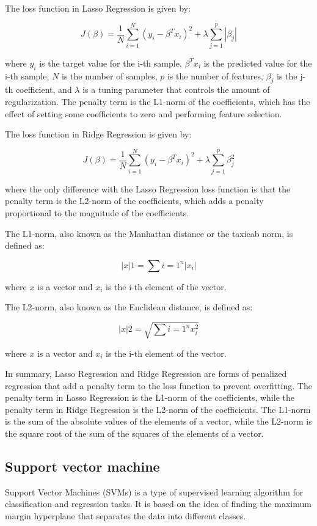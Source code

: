 \documentclass[12pt, a4paper, oneside]{article}
\begin{document}
The loss function in Lasso Regression is given by:

$$ J(\beta) = \frac{1}{N} \sum_{i=1}^{N} (y_i - \beta^T x_i)^2 + \lambda \sum_{j=1}^{p} |\beta_j| $$

where $y_i$ is the target value for the i-th sample, $\beta^T x_i$ is the predicted value for the i-th sample, $N$ is the number of samples, $p$ is the number of features, $\beta_j$ is the j-th coefficient, and $\lambda$ is a tuning parameter that controls the amount of regularization. The penalty term is the L1-norm of the coefficients, which has the effect of setting some coefficients to zero and performing feature selection.

The loss function in Ridge Regression is given by:

$$ J(\beta) = \frac{1}{N} \sum_{i=1}^{N} (y_i - \beta^T x_i)^2 + \lambda \sum_{j=1}^{p} \beta_j^2 $$

where the only difference with the Lasso Regression loss function is that the penalty term is the L2-norm of the coefficients, which adds a penalty proportional to the magnitude of the coefficients.

The L1-norm, also known as the Manhattan distance or the taxicab norm, is defined as:

$$ \left| x \right|1 = \sum{i=1}^{n} |x_i| $$

where $x$ is a vector and $x_i$ is the i-th element of the vector.

The L2-norm, also known as the Euclidean distance, is defined as:

$$ \left| x \right|2 = \sqrt{\sum{i=1}^{n} x_i^2} $$

where $x$ is a vector and $x_i$ is the i-th element of the vector.

In summary, Lasso Regression and Ridge Regression are forms of penalized regression that add a penalty term to the loss function to prevent overfitting. The penalty term in Lasso Regression is the L1-norm of the coefficients, while the penalty term in Ridge Regression is the L2-norm of the coefficients. The L1-norm is the sum of the absolute values of the elements of a vector, while the L2-norm is the square root of the sum of the squares of the elements of a vector.





\subsection{ Support vector machine }
Support Vector Machines (SVMs) is a type of supervised learning algorithm for classification and regression tasks. It is based on the idea of finding the maximum margin hyperplane that separates the data into different classes.
\end{document}
